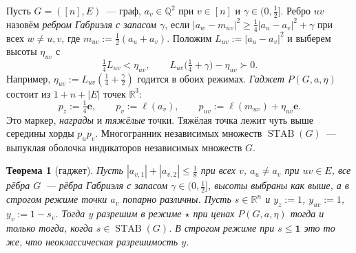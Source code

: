 \documentclass[a4paper,11pt]{article}
\theoremstyle{plain}
\newtheorem{theorem}{Теорема}[section]
\theoremstyle{definition}
\theoremstyle{remark}
\newcommand{\R}{\mathbb{R}}
\newcommand{\Q}{\mathbb{Q}}
\newcommand{\abs}[1]{\left\lvert #1 \right\rvert}
\DeclareMathOperator{\STAB}{STAB}
\newcommand{\gs}{\mathrel{\succ}}
\begin{document}
Пусть $G=([n],E)$~--- граф, $a_v\in\Q^2$ при $v\in[n]$ и $\gamma\in(0,\tfrac12]$. Ребро $uv$ назовём \emph{ребром Габриэля с запасом $\gamma$}, если $\abs{a_w-m_{uv}}^2\ge\tfrac14\abs{a_u-a_v}^2+\gamma$ при всех $w\ne u,v$, где $m_{uv}:=\tfrac12(a_u+a_v)$. Положим $L_{uv}:=\abs{a_u-a_v}^2$ и выберем высоты $\eta_{uv}$ с
\[
    \tfrac14L_{uv}<\eta_{uv},\qquad L_{uv}\bigl(\tfrac14+\gamma\bigr)-\eta_{uv}\gs0.
\]
Например, $\eta_{uv}:=L_{uv}(\tfrac14+\tfrac\gamma2)$ годится в обоих режимах. \emph{Гаджет} $P(G,a,\eta)$ состоит из $1+n+\abs E$ точек $\R^3$:
\[
    p_z:=\tfrac14\mathbf e,\qquad p_v:=\ell(a_v),\qquad p_{uv}:=\ell(m_{uv})+\eta_{uv}\mathbf e.
\]
Это маркер, \emph{награды} и \emph{тяжёлые} точки. Тяжёлая точка лежит чуть выше середины хорды $p_up_v$. Многогранник независимых множеств $\STAB(G)$~--- выпуклая оболочка индикаторов независимых множеств $G$.

\begin{theorem}[гаджет]\label{thm:gadget}
    Пусть $\abs{a_{v,1}}+\abs{a_{v,2}}\le\tfrac18$ при всех $v$, $a_u\ne a_v$ при $uv\in E$, все рёбра $G$~--- рёбра Габриэля с запасом $\gamma\in(0,\tfrac12]$, высоты выбраны как выше, а в строгом режиме точки $a_v$ попарно различны. Пусть $s\in\R^n$ и $y_z:=1$, $y_{uv}:=1$, $y_v:=1-s_v$. Тогда $y$ разрешим в режиме $\star$ при ценах $P(G,a,\eta)$ тогда и только тогда, когда $s\in\STAB(G)$. В строгом режиме при $s\le\mathbf 1$ это то же, что неоклассическая разрешимость $y$.
\end{theorem}
\end{document}
